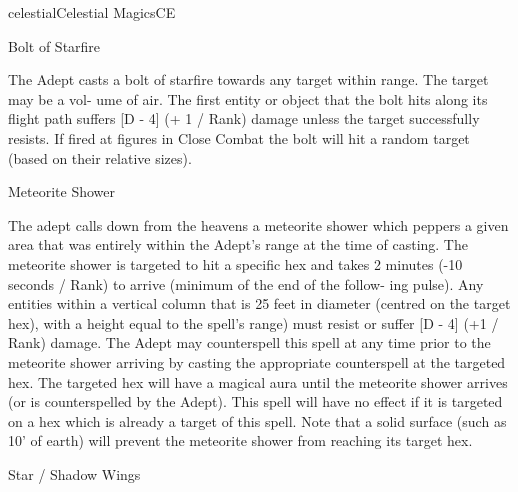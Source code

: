 \begin{College}[1.3]{celestial}{Celestial Magics}{CE}
\begin{spell}[S-3]{Bolt of Starfire }

\begin{effects}
 The  Adept  casts  a  bolt  of  starfire  towards 
any  target  within  range.  The  target  may  be  a  vol-
ume  of  air.  The  first  entity  or  object  that  the  bolt 
hits along its flight path suffers [D - 4] (+ 1 / Rank) 
damage  unless  the  target  successfully  resists.  If 
fired at figures in Close Combat the bolt will hit a 
random target (based on their relative sizes). 
\end{effects}
\end{spell}

\begin{spell}[S-4]{Meteorite Shower }

\begin{effects}
 The  adept  calls  down  from  the  heavens  a 
meteorite  shower  which  peppers  a  given  area  that 
was entirely within the Adept’s range at the time of 
casting.  The  meteorite  shower  is  targeted  to  hit  a 
specific  hex  and  takes  2  minutes  (-10  seconds  / 
Rank) to arrive (minimum of the end of the follow-
ing  pulse).  Any  entities  within  a  vertical  column 
that  is  25  feet  in  diameter  (centred  on  the  target 
hex), with a height equal to the spell’s range) must 
resist  or  suffer  [D  -  4]  (+1  /  Rank)  damage.  The 
Adept may counterspell this spell at any time prior 
to  the  meteorite  shower  arriving  by  casting  the 
appropriate  counterspell  at  the  targeted  hex.  The 
targeted  hex  will  have  a  magical  aura  until  the 
meteorite  shower  arrives  (or  is  counterspelled  by 
the  Adept).  This  spell  will  have  no  effect  if  it  is 
targeted  on  a  hex  which  is  already  a  target  of  this 
spell.  Note  that  a  solid  surface  (such  as  10’  of 
earth)  will  prevent  the  meteorite  shower  from 
reaching its target hex. 
\end{effects}
\end{spell}

\begin{spell}[S-5]{Star / Shadow Wings}


\end{spell}
\end{College}
